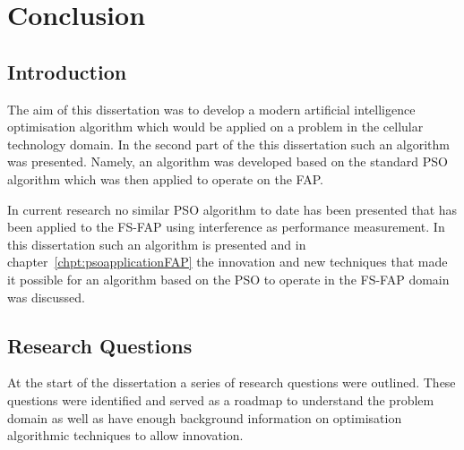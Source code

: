 \chapter{Conclusion}
\label{chpt:conclusion}
\section{Introduction}
The aim of this dissertation was to develop a modern artificial intelligence optimisation algorithm which would be applied on a problem in the cellular technology domain. In the second part of the this dissertation such an algorithm was presented. Namely, an algorithm was developed based on the standard PSO algorithm which was then applied to operate on the FAP. 

In current research no similar PSO algorithm to date has been presented that has been applied to the FS-FAP using interference as performance measurement. In this dissertation such an algorithm is presented and in chapter~\ref{chpt:psoapplicationFAP} the innovation and new techniques that made it possible for an algorithm based on the PSO to operate in the FS-FAP domain was discussed.

\section{Research Questions}
At the start of the dissertation a series of research questions were outlined. These questions were identified and served as a roadmap to understand the problem domain as well as have enough background information on optimisation algorithmic techniques to allow innovation.

